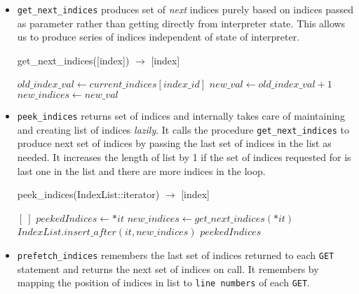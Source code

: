 \begin{itemize}
\item \texttt{get\_next\_indices} produces set of \textit{next} indices purely
  based on indices passed as parameter rather than getting directly from interpreter
  state. This allows us to produce series of indices independent of state of
  interpreter.
  \begin{algorithm}  {get\_next\_indices([index]) $\rightarrow$ [index]}
    \singlespacing

    \begin{algorithmic}[1]
      \State $old\_index\_val \gets current\_indices[index\_id]$
      \State $new\_val \gets old\_index\_val + 1$
      \State $new\_indices \gets new\_val$
      \EndFor%
      \State {}
      \EndFunction
    \end{algorithmic}
  \end{algorithm}

\item \texttt{peek\_indices} returns set of indices and internally takes care of
  maintaining and creating list of indices \textit{lazily}. It calls the procedure
  \texttt{get\_next\_indices} to produce next set of indices by passing the last
  set of indices in the list as needed. It increases the length of list by 1 if
  the set of indices requested for is last one in the list and there are more indices
  in the loop.

  \begin{algorithm}  {peek\_indices(IndexList::iterator) $\rightarrow$ [index]}
    \singlespacing

    \begin{algorithmic}[1]
      \State \Return $[\ ]$
      \Else
      \State $peekedIndices \gets *it$
      \State $new\_indices \gets get\_next\_indices(*it)$
      \State $IndexList.insert\_after(it, new\_indices)$
      \EndIf
      \State \Return $peekedIndices$
      \EndIf
      \EndFunction
    \end{algorithmic}
  \end{algorithm}

\item \texttt{prefetch\_indices} remembers the last set of indices returned to each
  \texttt{GET} statement and returns the next set of indices on call. It remembers
  by mapping the position of indices in list to \texttt{line numbers} of each
  \texttt{GET}.


\end{itemize}
